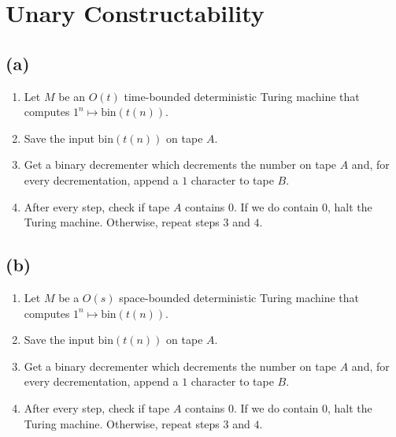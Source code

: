 



\section{Unary Constructability}

\subsection{(a)}
\begin{enumerate}
\item Let $M$ be an $O(t)$ time-bounded deterministic Turing machine that computes $1^{n}\mapsto \text{bin}(t(n))$.
\item Save the input $\text{bin}(t(n))$ on tape $A$.
\item Get a binary decrementer which decrements the number on tape $A$ and, for every decrementation, append a $1$ character to tape $B$.
\item After every step, check if tape $A$ contains $0$. If we do contain $0$, halt the Turing machine. Otherwise, repeat steps $3$ and $4$.
\end{enumerate}

\subsection{(b)}
\begin{enumerate}
\item Let $M$ be a $O(s)$ space-bounded deterministic Turing machine that computes $1^{n}\mapsto \text{bin}(t(n))$.
\item Save the input $\text{bin}(t(n))$ on tape $A$.
\item Get a binary decrementer which decrements the number on tape $A$ and, for every decrementation, append a $1$ character to tape $B$.
\item After every step, check if tape $A$ contains $0$. If we do contain $0$, halt the Turing machine. Otherwise, repeat steps $3$ and $4$.
\end{enumerate}


